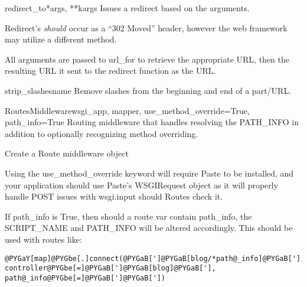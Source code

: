 \documentclass[letterpaper,10pt,english]{manual}
\begin{document}
\hypertarget{routes.redirect_to}{}\begin{funcdesc}{redirect\_to}{*args, **kargs}
Issues a redirect based on the arguments.

Redirect's \emph{should} occur as a ``302 Moved'' header, however the web 
framework may utilize a different method.

All arguments are passed to url\_for to retrieve the appropriate URL, then
the resulting URL it sent to the redirect function as the URL.
\end{funcdesc}

\hypertarget{routes.mapper.strip_slashes}{}\begin{funcdesc}{strip\_slashes}{name}
Remove slashes from the beginning and end of a part/URL.
\end{funcdesc}

\hypertarget{routes.middleware.RoutesMiddleware}{}\begin{classdesc}{RoutesMiddleware}{wsgi\_app, mapper, use\_method\_override=True, path\_info=True}
Routing middleware that handles resolving the PATH\_INFO in
addition to optionally recognizing method overriding.

Create a Route middleware object

Using the use\_method\_override keyword will require Paste to be
installed, and your application should use Paste's WSGIRequest
object as it will properly handle POST issues with wsgi.input
should Routes check it.

If path\_info is True, then should a route var contain
path\_info, the SCRIPT\_NAME and PATH\_INFO will be altered
accordingly. This should be used with routes like:

\begin{Verbatim}[commandchars=@\[\]]
@PYGaY[map]@PYGbe[.]connect(@PYGaB[']@PYGaB[blog/*path@_info]@PYGaB['], controller@PYGbe[=]@PYGaB[']@PYGaB[blog]@PYGaB['], path@_info@PYGbe[=]@PYGaB[']@PYGaB['])
\end{Verbatim}
\end{classdesc}


\renewcommand{\indexname}{Module Index}

\renewcommand{\indexname}{Index}
\printindex
\end{document}
